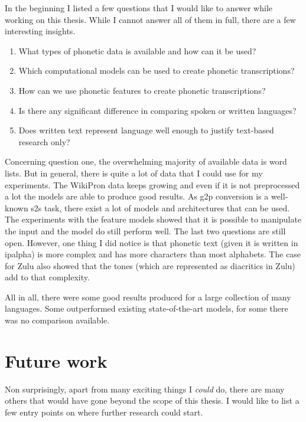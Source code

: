 \label{chap:6_conclusion}
In the beginning I listed a few questions that I would like to answer while working on this thesis. While I cannot answer all of them in full, there are a few interesting insights.

\begin{enumerate}
\item What types of phonetic data is available and how can it be used?
\item Which computational models can be used to create phonetic transcriptions?
\item How can we use phonetic features to create phonetic transcriptions?
\item Is there any significant difference in comparing spoken or written languages?
\item Does written text represent language well enough to justify text-based research only?
\end{enumerate}

Concerning question one, the overwhelming majority of available data is word lists. But in general, there is quite a lot of data that I could use for my experiments. The WikiPron data keeps growing and even if it is not preprocessed a lot the models are able to produce good results. As \ac{g2p} conversion is a well-known \ac{s2s} task, there exist a lot of models and architectures that can be used. The experiments with the feature models showed that it is possible to manipulate the input and the model do still perform well. The last two questions are still open. However, one thing I did notice is that phonetic text (given it is written in \ac{ipalpha}) is more complex and has more characters than most alphabets. The case for Zulu also showed that the tones (which are represented as diacritics in Zulu) add to that complexity. 

All in all, there were some good results produced for a large collection of many languages. Some outperformed existing state-of-the-art models, for some there was no comparison available. 

\section{Future work}
Non surprisingly, apart from many exciting things I \textit{could} do, there are many others that would have gone beyond the scope of this thesis. I would like to list a few entry points on where further research could start. 

